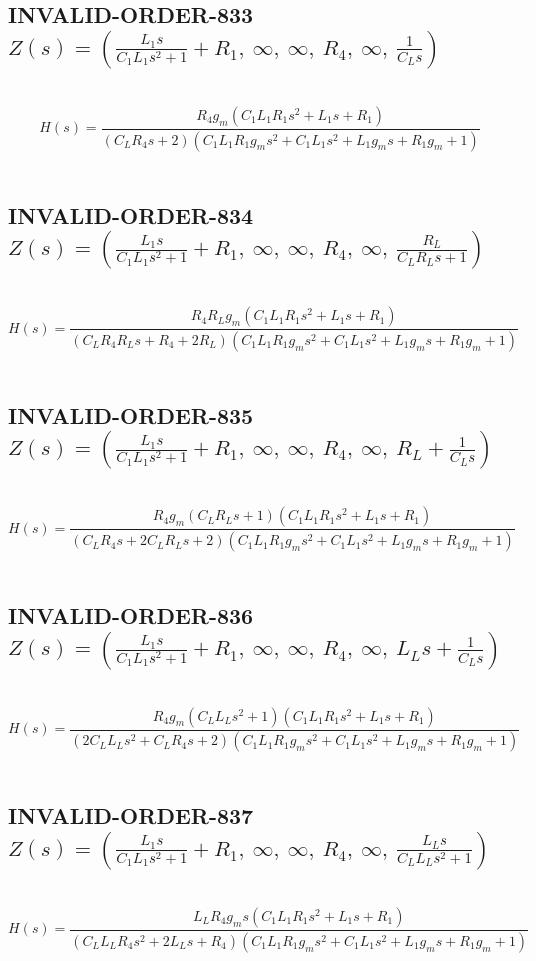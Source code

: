\documentclass{article}
\begin{document}
\subsection{INVALID-ORDER-833 $Z(s) = \left( \frac{L_{1} s}{C_{1} L_{1} s^{2} + 1} + R_{1}, \  \infty, \  \infty, \  R_{4}, \  \infty, \  \frac{1}{C_{L} s}\right)$ } \ 
\textbf{\[H(s) = \frac{R_{4} g_{m} \left(C_{1} L_{1} R_{1} s^{2} + L_{1} s + R_{1}\right)}{\left(C_{L} R_{4} s + 2\right) \left(C_{1} L_{1} R_{1} g_{m} s^{2} + C_{1} L_{1} s^{2} + L_{1} g_{m} s + R_{1} g_{m} + 1\right)}\] } \ 
\subsection{INVALID-ORDER-834 $Z(s) = \left( \frac{L_{1} s}{C_{1} L_{1} s^{2} + 1} + R_{1}, \  \infty, \  \infty, \  R_{4}, \  \infty, \  \frac{R_{L}}{C_{L} R_{L} s + 1}\right)$ } \ 
\textbf{\[H(s) = \frac{R_{4} R_{L} g_{m} \left(C_{1} L_{1} R_{1} s^{2} + L_{1} s + R_{1}\right)}{\left(C_{L} R_{4} R_{L} s + R_{4} + 2 R_{L}\right) \left(C_{1} L_{1} R_{1} g_{m} s^{2} + C_{1} L_{1} s^{2} + L_{1} g_{m} s + R_{1} g_{m} + 1\right)}\] } \ 
\subsection{INVALID-ORDER-835 $Z(s) = \left( \frac{L_{1} s}{C_{1} L_{1} s^{2} + 1} + R_{1}, \  \infty, \  \infty, \  R_{4}, \  \infty, \  R_{L} + \frac{1}{C_{L} s}\right)$ } \ 
\textbf{\[H(s) = \frac{R_{4} g_{m} \left(C_{L} R_{L} s + 1\right) \left(C_{1} L_{1} R_{1} s^{2} + L_{1} s + R_{1}\right)}{\left(C_{L} R_{4} s + 2 C_{L} R_{L} s + 2\right) \left(C_{1} L_{1} R_{1} g_{m} s^{2} + C_{1} L_{1} s^{2} + L_{1} g_{m} s + R_{1} g_{m} + 1\right)}\] } \ 
\subsection{INVALID-ORDER-836 $Z(s) = \left( \frac{L_{1} s}{C_{1} L_{1} s^{2} + 1} + R_{1}, \  \infty, \  \infty, \  R_{4}, \  \infty, \  L_{L} s + \frac{1}{C_{L} s}\right)$ } \ 
\textbf{\[H(s) = \frac{R_{4} g_{m} \left(C_{L} L_{L} s^{2} + 1\right) \left(C_{1} L_{1} R_{1} s^{2} + L_{1} s + R_{1}\right)}{\left(2 C_{L} L_{L} s^{2} + C_{L} R_{4} s + 2\right) \left(C_{1} L_{1} R_{1} g_{m} s^{2} + C_{1} L_{1} s^{2} + L_{1} g_{m} s + R_{1} g_{m} + 1\right)}\] } \ 
\subsection{INVALID-ORDER-837 $Z(s) = \left( \frac{L_{1} s}{C_{1} L_{1} s^{2} + 1} + R_{1}, \  \infty, \  \infty, \  R_{4}, \  \infty, \  \frac{L_{L} s}{C_{L} L_{L} s^{2} + 1}\right)$ } \ 
\textbf{\[H(s) = \frac{L_{L} R_{4} g_{m} s \left(C_{1} L_{1} R_{1} s^{2} + L_{1} s + R_{1}\right)}{\left(C_{L} L_{L} R_{4} s^{2} + 2 L_{L} s + R_{4}\right) \left(C_{1} L_{1} R_{1} g_{m} s^{2} + C_{1} L_{1} s^{2} + L_{1} g_{m} s + R_{1} g_{m} + 1\right)}\] } \ 
\end{document}
